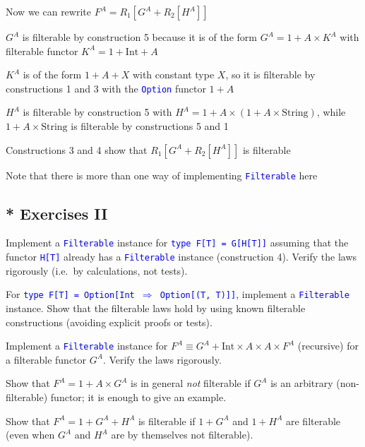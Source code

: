 Now we can rewrite {\footnotesize{}$F^{A}=R_{1}\left[G^{A}+R_{2}\left[H^{A}\right]\right]$}{\footnotesize\par}

$G^{A}$ is filterable by construction 5 because it is of the form
$G^{A}=1+A\times K^{A}$ with filterable functor $K^{A}=1+\text{Int}+A$

$K^{A}$ is of the form $1+A+X$ with constant type $X$, so it is
filterable by constructions 1 and 3 with the \texttt{\textcolor{blue}{\footnotesize{}Option}}
functor $1+A$

$H^{A}$ is filterable by construction 5 with $H^{A}=1+A\times\left(1+A\times\text{String}\right)$,
while $1+A\times\text{String}$ is filterable by constructions 5 and
1

Constructions 3 and 4 show that $R_{1}\left[G^{A}+R_{2}\left[H^{A}\right]\right]$
is filterable

Note that there is more than one way of implementing \texttt{\textcolor{blue}{\footnotesize{}Filterable}}
here


\subsection{{*} Exercises II}

Implement a \texttt{\textcolor{blue}{\footnotesize{}Filterable}} instance
for \texttt{\textcolor{blue}{\footnotesize{}type F{[}T{]} = G{[}H{[}T{]}{]}}}
assuming that the functor \texttt{\textcolor{blue}{\footnotesize{}H{[}T{]}}}
already has a \texttt{\textcolor{blue}{\footnotesize{}Filterable}}
instance (construction 4). Verify the laws rigorously (i.e.\ by calculations,
not tests).

For \texttt{\textcolor{blue}{\footnotesize{}type F{[}T{]} = Option{[}Int
$\Rightarrow$ Option{[}(T, T){]}{]}}}, implement a \texttt{\textcolor{blue}{\footnotesize{}Filterable}}
instance. Show that the filterable laws hold by using known filterable
constructions (avoiding explicit proofs or tests).

Implement a \texttt{\textcolor{blue}{\footnotesize{}Filterable}} instance
for $F^{A}\equiv G^{A}+\text{Int}\times A\times A\times F^{A}$ (recursive)
for a filterable functor $G^{A}$. Verify the laws rigorously.

Show that $F^{A}=1+A\times G^{A}$ is in general \emph{not} filterable
if $G^{A}$ is an arbitrary (non-filterable) functor; it is enough
to give an example.

Show that $F^{A}=1+G^{A}+H^{A}$ is filterable if $1+G^{A}$ and $1+H^{A}$
are filterable (even when $G^{A}$ and $H^{A}$ are by themselves
not filterable).

